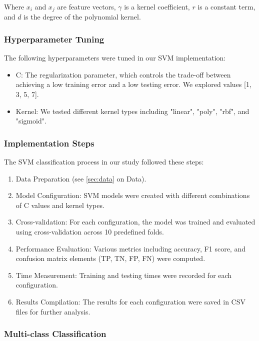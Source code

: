 Where $x_i$ and $x_j$ are feature vectors, $\gamma$ is a kernel coefficient, $r$ is a constant term, and $d$ is the degree of the polynomial kernel.

\subsubsection{Hyperparameter Tuning}

The following hyperparameters were tuned in our SVM implementation:

\begin{itemize}
    \item C: The regularization parameter, which controls the trade-off between achieving a low training error and a low testing error. We explored values [1, 3, 5, 7].
    \item Kernel: We tested different kernel types including "linear", "poly", "rbf", and "sigmoid".
\end{itemize}

\subsubsection{Implementation Steps}

The SVM classification process in our study followed these steps:

\begin{enumerate}
    \item Data Preparation (see \autoref{sec:data} on Data).
    \item Model Configuration: SVM models were created with different combinations of C values and kernel types.
    \item Cross-validation: For each configuration, the model was trained and evaluated using cross-validation across 10 predefined folds.
    \item Performance Evaluation: Various metrics including accuracy, F1 score, and confusion matrix elements (TP, TN, FP, FN) were computed.
    \item Time Measurement: Training and testing times were recorded for each configuration.
    \item Results Compilation: The results for each configuration were saved in CSV files for further analysis.
\end{enumerate}

\subsubsection{Multi-class Classification}

